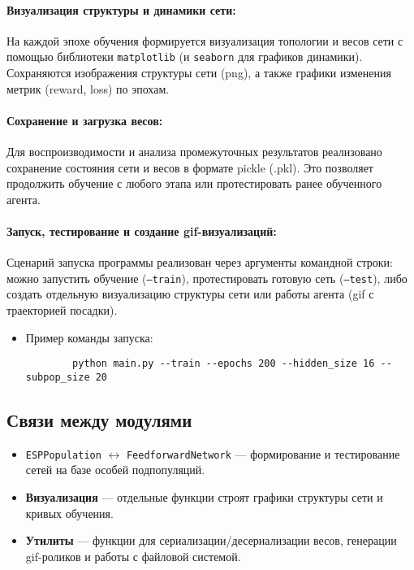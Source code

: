 \documentclass[a4paper,12pt]{article}
\begin{document}
\paragraph{Визуализация структуры и динамики сети:}

На каждой эпохе обучения формируется визуализация топологии и весов сети с помощью библиотеки \texttt{matplotlib} (и \texttt{seaborn} для графиков динамики). Сохраняются изображения структуры сети (png), а также графики изменения метрик (reward, loss) по эпохам.

\paragraph{Сохранение и загрузка весов:}

Для воспроизводимости и анализа промежуточных результатов реализовано сохранение состояния сети и весов в формате pickle (.pkl). Это позволяет продолжить обучение с любого этапа или протестировать ранее обученного агента.

\paragraph{Запуск, тестирование и создание gif-визуализаций:}

Сценарий запуска программы реализован через аргументы командной строки: можно запустить обучение (\texttt{--train}), протестировать готовую сеть (\texttt{--test}), либо создать отдельную визуализацию структуры сети или работы агента (gif с траекторией посадки).

\begin{itemize}
	\item[] Пример команды запуска:
	\begin{lstlisting}
		python main.py --train --epochs 200 --hidden_size 16 --subpop_size 20
	\end{lstlisting}
\end{itemize}

\subsection{Связи между модулями}

\begin{itemize}
	\item \texttt{ESPPopulation} $\leftrightarrow$ \texttt{FeedforwardNetwork} --- формирование и тестирование сетей на базе особей подпопуляций.
	\item \textbf{Визуализация} --- отдельные функции строят графики структуры сети и кривых обучения.
	\item \textbf{Утилиты} --- функции для сериализации/десериализации весов, генерации gif-роликов и работы с файловой системой.
\end{itemize}
\end{document}
